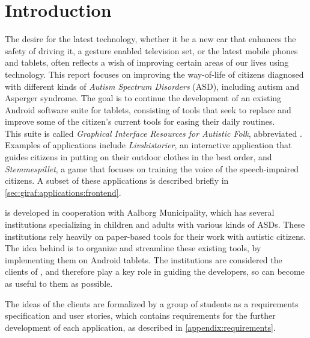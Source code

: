 \newcommand{\headerIntroduction}{Introduction}
\chapter*{\headerIntroduction}\label{chap:introduction}
\addcontentsline{toc}{chapter}{\headerIntroduction}

The desire for the latest technology, whether it be a new car that enhances the safety of driving it, a gesture enabled television set, or the latest mobile phones and tablets, often reflects a wish of improving certain areas of our lives using technology.
This report focuses on improving the way-of-life of citizens diagnosed with different kinds of \textit{Autism Spectrum Disorders} (ASD), including autism and Asperger syndrome.
The goal is to continue the development of an existing Android software suite for tablets, consisting of tools that seek to replace and improve some of the citizen's current tools for easing their daily routines. \\

This suite is called \textit{Graphical Interface Resources for Autistic Folk}, abbreviated \giraf.\\

Examples of \giraf applications include \textit{Livshistorier}, an interactive application that guides citizens in putting on their outdoor clothes in the best order, and \textit{Stemmespillet}, a game that focuses on training the voice of the speech-impaired citizens.
A subset of these applications is described briefly in \cref{sec:giraf:applications:frontend}.

\giraf is developed in cooperation with Aalborg Municipality, which has several institutions specializing in children and adults with various kinds of ASDs.
These institutions rely heavily on paper-based tools for their work with autistic citizens.
The idea behind \giraf is to organize and streamline these existing tools, by implementing them on Android tablets.
The institutions are considered the clients of \giraf, and therefore play a key role in guiding the developers, so \giraf can become as useful to them as possible.

The ideas of the clients are formalized by a group of students as a requirements specification and user stories, which contains requirements for the further development of each application, as described in \cref{appendix:requirements}.